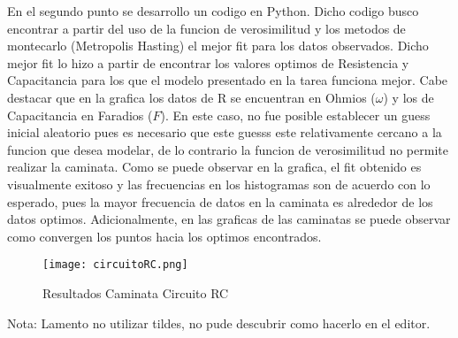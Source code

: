 \documentclass[12pt]{article}
\begin{document}
En el segundo punto se desarrollo un codigo en Python. Dicho codigo busco encontrar a partir del uso de la funcion de verosimilitud y los metodos de montecarlo (Metropolis Hasting) el mejor fit para los datos observados. Dicho mejor fit lo hizo a partir de encontrar los valores optimos de Resistencia  y Capacitancia para los que el modelo presentado en la tarea funciona mejor. Cabe destacar que en la grafica los datos de R se encuentran en Ohmios ($\omega$) y los de Capacitancia en Faradios ($F$). En este caso, no fue posible establecer un guess inicial aleatorio pues es necesario que este guesss este relativamente cercano a la funcion que desea modelar, de lo contrario la funcion de verosimilitud no permite realizar la caminata. Como se puede observar en la grafica, el fit obtenido es visualmente exitoso y las frecuencias en los histogramas son de acuerdo con lo esperado, pues la mayor frecuencia de datos en la caminata es alrededor de los datos optimos. Adicionalmente, en las graficas de las caminatas se puede observar como convergen los puntos hacia los optimos encontrados.

\begin{figure}[h]
\begin{center}
\texttt{[image: circuitoRC.png]}
\end{center}
\caption{Resultados Caminata Circuito RC}
\end{figure}

Nota: Lamento no utilizar tildes, no pude descubrir como hacerlo en el editor.
\end{document}
